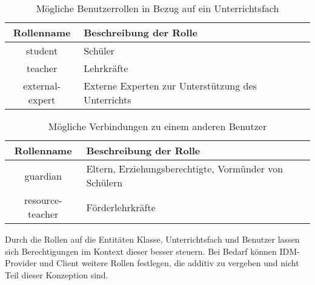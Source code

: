 \begin{table}[htb]
	\begin{tabularx}{\textwidth}{|c|X|}
		\hline
\textbf{Rollenname} & \textbf{Beschreibung der Rolle} \\ \hline
student & Schüler \\ \hline
teacher & Lehrkräfte \\ \hline
external-expert & Externe Experten zur Unterstützung des Unterrichts \\ \hline
	\end{tabularx}

		\caption{Mögliche Benutzerrollen in Bezug auf ein Unterrichtsfach}
		\label{tab:intro:rolessubject}
\end{table}

\begin{table}[htb]
	\begin{tabularx}{\textwidth}{|c|X|}
		\hline
\textbf{Rollenname} & \textbf{Beschreibung der Rolle} \\ \hline
guardian & Eltern, Erziehungsberechtigte, Vormünder von Schülern \\ \hline
resource-teacher & Förderlehrkräfte \\ \hline
	\end{tabularx}

		\caption{Mögliche Verbindungen zu einem anderen Benutzer}
		\label{tab:intro:rolesuser}
\end{table}


Durch die Rollen auf die Entitäten Klasse, Unterrichtsfach und Benutzer lassen sich Berechtigungen im Kontext dieser besser steuern. 
Bei Bedarf können IDM-Provider und Client weitere Rollen festlegen, die additiv zu vergeben und nicht Teil dieser Konzeption sind.
